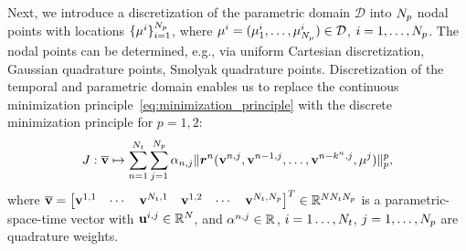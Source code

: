 \documentclass[3p,computermodern,10pt]{elsarticle}
\begin{document}
Next, we introduce a discretization of the parametric domain $\mathcal{D}$ into $N_p$ nodal points with locations $\{ \mathbf{\mu}^i \}_{i = 1}^{N_p}$, where $\mathbf{\mu}^i = (\mathbf{\mu}^i_1 , \ldots,\mathbf{\mu}^i_{N_{\mu}}) \in \mathcal{D}$, $i=1,\ldots,N_p$. The nodal points can be determined, e.g., via uniform Cartesian discretization, Gaussian quadrature points, Smolyak quadrature points. Discretization of the temporal and parametric domain enables us to replace the continuous minimization principle~\eqref{eq:minimization_principle} with the discrete minimization principle for $p=1,2$:
 \begin{equation}\label{eq:discrete_minimization_principle}
J : \overline{\mathbf{v}}  \mapsto \sum_{n=1}^{N_t}  \sum_{j=1}^{N_p} \alpha_{n,j} \| \boldsymbol{r}^n (\mathbf{v}^{n,j},\mathbf{v}^{n-1,j},\ldots,\mathbf{v}^{n-k^n,j},\mathbf{\mu}^j) \|_{p}^p,
\end{equation}
where $\overline{\mathbf{v}} =  \begin{bmatrix} \mathbf{v}^{1,1} & \cdots & \mathbf{v}^{N_t,1} & \mathbf{v}^{1,2} & \cdots & \mathbf{v}^{N_t,N_p} \end{bmatrix}^T \in \mathbb{R}^{N N_t N_p}$ is a parametric-space-time vector with $\mathbf{u}^{i,j} \in \mathbb{R}^{N}$, and $\alpha^{n,j} \in \mathbb{R}^{}$, $i=1\dots,N_t$, $j=1,\ldots,N_p$ are quadrature weights. 
\end{document}
